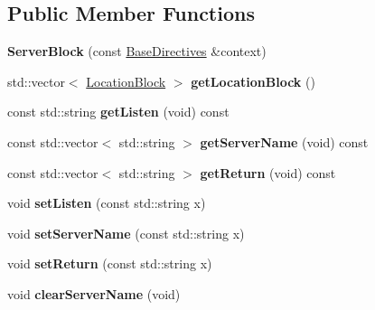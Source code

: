 \subsection*{Public Member Functions}
\begin{DoxyCompactItemize}
\item 
\mbox{\label{classft_1_1ServerBlock_add5bc35a679897d785c4350077feea65}} 
{\bfseries Server\+Block} (const \hyperlink{classft_1_1BaseDirectives}{Base\+Directives} \&context)
\item 
\mbox{\label{classft_1_1ServerBlock_aa30b947d8c2a867b1bc723f000a32ab0}} 
std\+::vector$<$ \hyperlink{classft_1_1LocationBlock}{Location\+Block} $>$ {\bfseries get\+Location\+Block} ()
\item 
\mbox{\label{classft_1_1ServerBlock_a0b9e1a99edee90147fefb78bdbc928eb}} 
const std\+::string {\bfseries get\+Listen} (void) const
\item 
\mbox{\label{classft_1_1ServerBlock_aa42b5ae60acffb1a5a4459d59b7bf956}} 
const std\+::vector$<$ std\+::string $>$ {\bfseries get\+Server\+Name} (void) const
\item 
\mbox{\label{classft_1_1ServerBlock_adc53f4c03d6040ee1d02b3ebbb8f0169}} 
const std\+::vector$<$ std\+::string $>$ {\bfseries get\+Return} (void) const
\item 
\mbox{\label{classft_1_1ServerBlock_a1b0fb905b605eae2245ce990f4daeae7}} 
void {\bfseries set\+Listen} (const std\+::string x)
\item 
\mbox{\label{classft_1_1ServerBlock_a71e66aa6e1f6035d17eb090103849d54}} 
void {\bfseries set\+Server\+Name} (const std\+::string x)
\item 
\mbox{\label{classft_1_1ServerBlock_ab99608fa84255378d2686efe31910a1f}} 
void {\bfseries set\+Return} (const std\+::string x)
\item 
\mbox{\label{classft_1_1ServerBlock_af0743afafd72b182060a335f0278f275}} 
void {\bfseries clear\+Server\+Name} (void)
\end{DoxyCompactItemize}

